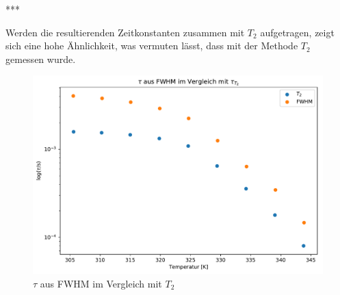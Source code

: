 ***

Werden die resultierenden Zeitkonstanten zusammen mit $T_2$ aufgetragen, zeigt sich eine hohe Ähnlichkeit, was vermuten lässt, dass mit der Methode $T_2$ gemessen wurde.
\begin{figure}
	\begin{center}
		\includegraphics[width=\textwidth]{graphics/plots/SPEKDYN/spekdyn_t2.pdf}
	\end{center}
	\caption{$\tau$ aus FWHM im Vergleich mit $T_2$} \label{fig:res:spekdyn_t2}
\end{figure}
